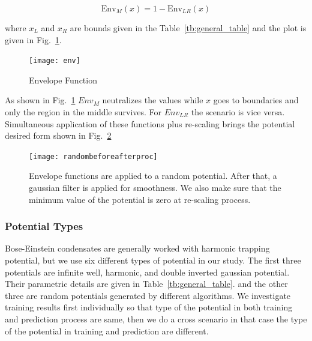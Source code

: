 \documentclass[a4paper,times,hidelinks,12pt]{article}
\begin{document}
\begin{equation}
\label{eq:envelope_potential_m}
    \text{Env}_{M}(x) = 1 - \text{Env}_{LR}(x)
\end{equation}

\noindent where $x_L$ and $x_R$ are bounds given in the Table~\eqref{tb:general_table} and the plot is given in Fig.~\ref{fig:envelope_and_random_withot_pros}.  

\graphicspath{{"../figs/potentials/"}}
\begin{figure}[H]
\centering
\texttt{[image: env]}
\caption{Envelope Function}
\label{fig:envelope_and_random_withot_pros}
\end{figure}

As shown in Fig.~\ref{fig:envelope_and_random_withot_pros} $Env_{M}$ neutralizes the values while $x$ goes to boundaries and only the region in the middle survives. For $Env_{LR}$ the scenario is vice versa. Simultaneous application of these functions plus re-scaling brings the potential desired form shown in Fig.~\ref{fig:random_plus_envelope}


\graphicspath{{"../figs/potentials/"}}
\begin{figure}[H]
    \texttt{[image: randombeforeafterproc]}
\caption{Envelope functions are applied to a random potential. After that, a gaussian filter is applied for smoothness. We also make sure that the minimum value of the potential is zero at re-scaling process.}
\label{fig:random_plus_envelope}
\end{figure}





\subsubsection{Potential Types}

Bose-Einstein condensates are generally worked with harmonic trapping potential, but we use six different types of potential in our study. The first three potentials are infinite well, harmonic, and double inverted gaussian potential. Their parametric details are given in Table~\ref{tb:general_table}. and the other three are random potentials generated by different algorithms. We investigate training results first individually so that type of the potential in both training and prediction process are same, then we do a cross scenario in that case the type of the potential in training and prediction are different.

\newcommand{\infinitewell}{$
V(x) = 
    \begin{cases}
       0 &\quad\text{if } x_l < x < x_r  \\
       \infty &\quad\text{if } \textit{otherwise} \\
    \end{cases}
$}
\end{document}
